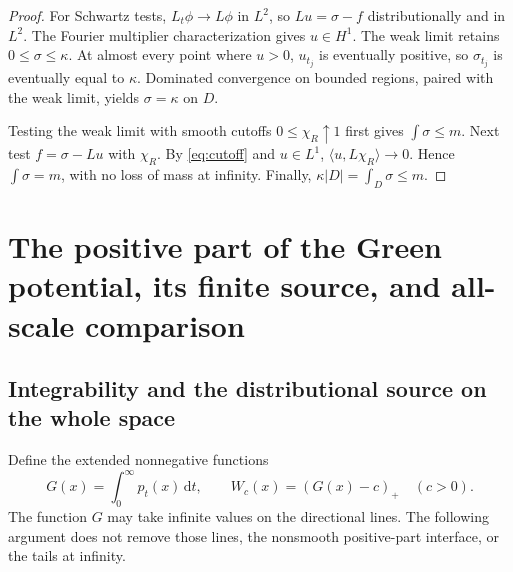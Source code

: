 \documentclass[11pt,a4paper]{article}
\theoremstyle{definition}\newtheorem{definition}[theorem]{Definition}
\theoremstyle{remark}\newtheorem{remark}[theorem]{Remark}
\newcommand{\dd}{\,\mathrm d}
\newcommand{\abs}[1]{\left|#1\right|}
\newcommand{\pos}[1]{(#1)_+}
\begin{document}
\begin{proof}
For Schwartz tests, $L_t\phi\to L\phi$ in $L^2$, so $Lu=\sigma-f$ distributionally and in $L^2$. The Fourier multiplier characterization gives $u\in H^1$. The weak limit retains $0\le\sigma\le\kappa$. At almost every point where $u>0$, $u_{t_j}$ is eventually positive, so $\sigma_{t_j}$ is eventually equal to $\kappa$. Dominated convergence on bounded regions, paired with the weak limit, yields $\sigma=\kappa$ on $D$.

Testing the weak limit with smooth cutoffs $0\le\chi_R\uparrow1$ first gives $\int\sigma\le m$. Next test $f=\sigma-Lu$ with $\chi_R$. By \eqref{eq:cutoff} and $u\in L^1$, $\langle u,L\chi_R\rangle\to0$. Hence $\int\sigma=m$, with no loss of mass at infinity. Finally, $\kappa\abs D=\int_D\sigma\le m$.
\end{proof}

\section{The positive part of the Green potential, its finite source, and all-scale comparison}
\subsection{Integrability and the distributional source on the whole space}
Define the extended nonnegative functions
\begin{equation}\label{eq:Green}
 G(x)=\int_0^\infty p_t(x)\dd t,
 \qquad W_c(x)=\pos{G(x)-c}\quad(c>0).
\end{equation}
The function $G$ may take infinite values on the directional lines. The following argument does not remove those lines, the nonsmooth positive-part interface, or the tails at infinity.
\end{document}

